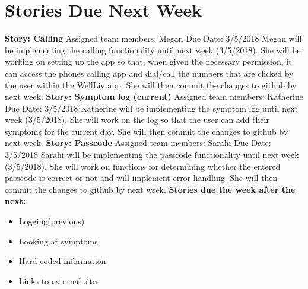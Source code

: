 \documentclass[letterpaper,12pt,titlepage]{article}
\begin{document}
\section{Stories Due Next Week}
\textbf{Story: Calling}
\newline
Assigned team members: Megan
\newline
Due Date: 3/5/2018
\newline
\newline
Megan will be implementing the calling functionality until next week (3/5/2018). She will be working on setting up the app so that, when given the necessary permission, it can access the phones calling app and dial/call the numbers that are clicked by the user within the WellLiv app. She will then commit the changes to github by next week.
\newline
\newline
\textbf{Story: Symptom log (current)}
\newline
Assigned team members: Katherine
\newline
Due Date: 3/5/2018
\newline
\newline
Katherine will be implementing the symptom log until next week (3/5/2018). She will work on the log so that the user can add their symptoms for the current day. She will then commit the changes to github by next week.
\newline
\newline
\textbf{Story: Passcode}
\newline
Assigned team members: Sarahi
\newline
Due Date: 3/5/2018
\newline
\newline
Sarahi will be implementing the passcode functionality until next week (3/5/2018). She will work on functions for determining whether the entered passcode is correct or not and will implement error handling. She will then commit the changes to github by next week.
\newline
\newline
\textbf{Stories due the week after the next:}
\begin{itemize}
\item Logging(previous)
\item Looking at symptoms
\item Hard coded information
\item Links to external sites
\end{itemize}
\newpage
\end{document}
